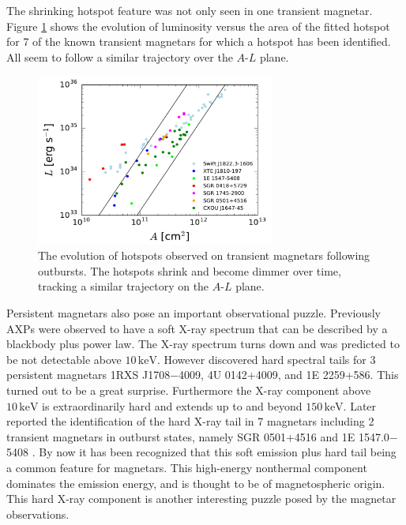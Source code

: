 The shrinking hotspot feature was not only seen in one transient magnetar.
Figure \ref{fig:hotspots} shows the evolution of luminosity versus the area of
the fitted hotspot for 7 of the known transient magnetars for which a hotspot
has been identified. All seem to follow a similar trajectory over the $A$-$L$ plane.

\begin{figure}[h]
  \centering
  \includegraphics[width=0.7\textwidth]{pics/intro/hot-spot.png}
  \caption[The evolution of hotspots observed on transient magnetars following
    outbursts.]{The evolution of hotspots observed on transient magnetars following
    outbursts. The hotspots shrink and become dimmer over time, tracking a
    similar trajectory on the $A$-$L$ plane. \citep{beloborodov_magnetar_2016}}
  \label{fig:hotspots}
\end{figure}

Persistent magnetars also pose an important observational puzzle. Previously
AXPs were observed to have a soft X-ray spectrum that can be described by a
blackbody plus power law. The X-ray spectrum turns down and was predicted to be
not detectable above $10\,\mathrm{keV}$. However \citet{kuiper_discovery_2006}
discovered hard spectral tails for 3 persistent magnetars 1RXS J1708$-$4009, 4U
0142+4009, and 1E 2259+586. This turned out to be a great surprise. Furthermore
the X-ray component above $10\,\mathrm{keV}$ is extraordinarily hard and extends
up to and beyond $150\,\mathrm{keV}$. Later \citet{enoto_broadband_2010}
reported the identification of the hard X-ray tail in 7 magnetars including 2
transient magnetars in outburst states, namely SGR 0501+4516
\citep{enoto_wide-band_2010} and 1E 1547.0$-$5408 \citep{enoto_suzaku_2010}. By
now it has been recognized that this soft emission plus hard tail being a common
feature for magnetars. This high-energy nonthermal component dominates the
emission energy, and is thought to be of magnetospheric origin. This hard X-ray
component is another interesting puzzle posed by the magnetar observations.

